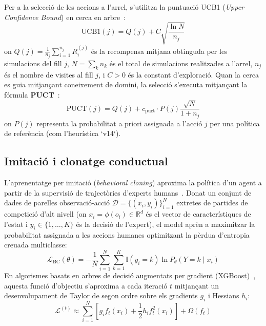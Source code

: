 Per a la selecció de les accions a l'arrel, s'utilitza la puntuació UCB1 (\emph{Upper Confidence Bound}) en cerca en arbre~\cite{kocsis_uct, mcts_survey}:
\begin{equation}
    \mathrm{UCB1}(j) = Q(j) + C \sqrt{\frac{\ln N}{n_j}}
    \label{eq:ucb1_formula}
\end{equation}
on $Q(j) = \frac{1}{n_j} \sum_{i=1}^{n_j} R_i^{(j)}$ és la recompensa mitjana obtinguda per les simulacions del fill $j$, $N = \sum_k n_k$ és el total de simulacions realitzades a l'arrel, $n_j$ és el nombre de visites al fill $j$, i $C > 0$ és la constant d'exploració. Quan la cerca es guia mitjançant coneixement de domini, la selecció s'executa mitjançant la fórmula \textbf{PUCT}~\cite{alphago}:
\begin{equation}
    \mathrm{PUCT}(j) = Q(j) + c_{\mathrm{puct}} \cdot P(j) \frac{\sqrt{N}}{1 + n_j}
    \label{eq:puct_formula}
\end{equation}
on $P(j)$ representa la probabilitat a priori assignada a l'acció $j$ per una política de referència (com l'heurística `v14`).

\subsection{Imitació i clonatge conductual}
\label{subsec:teoria_imitacio}

L'aprenentatge per imitació (\emph{behavioral cloning}) aproxima la política d'un agent a partir de la supervisió de trajectòries d'experts humans~\cite{pomerleau_alvinn, argall_lfd, ross_dagger}. Donat un conjunt de dades de parelles observació-acció $\mathcal{D} = \{(x_i, y_i)\}_{i=1}^N$ extretes de partides de competició d'alt nivell (on $x_i = \phi(o_i) \in \mathbb{R}^d$ és el vector de característiques de l'estat i $y_i \in \{1, \dots, K\}$ és la decisió de l'expert), el model aprèn a maximitzar la probabilitat assignada a les accions humanes optimitzant la pèrdua d'entropia creuada multiclasse:
\begin{equation}
    \mathcal{L}_{\mathrm{BC}}(\theta) = -\frac{1}{N} \sum_{i=1}^N \sum_{k=1}^K \mathbb{I}(y_i = k) \ln P_\theta(Y=k \mid x_i)
    \label{eq:bc_cross_entropy}
\end{equation}
En algorismes basats en arbres de decisió augmentats per gradient (XGBoost)~\cite{xgboost}, aquesta funció d'objectiu s'aproxima a cada iteració $t$ mitjançant un desenvolupament de Taylor de segon ordre sobre els gradients $g_i$ i Hessians $h_i$:
\begin{equation}
    \mathcal{L}^{(t)} \approx \sum_{i=1}^N \left[ g_i f_t(x_i) + \frac{1}{2} h_i f_t^2(x_i) \right] + \Omega(f_t)
    \label{eq:xgboost_taylor}
\end{equation}

